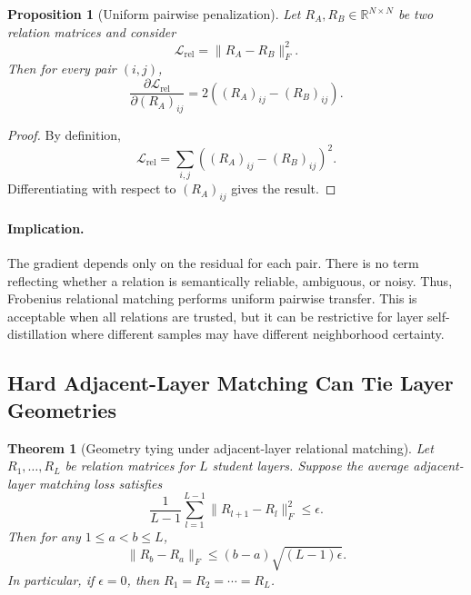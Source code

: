 \documentclass[letterpaper]{article}
\newtheorem{theorem}{Theorem}
\newtheorem{proposition}{Proposition}
\begin{document}
\begin{proposition}[Uniform pairwise penalization]
Let $R_A,R_B\in\mathbb{R}^{N\times N}$ be two relation matrices and consider
\begin{equation}
    \mathcal{L}_{\mathrm{rel}}=\|R_A-R_B\|_F^2.
\end{equation}
Then for every pair $(i,j)$,
\begin{equation}
    \frac{\partial \mathcal{L}_{\mathrm{rel}}}{\partial (R_A)_{ij}}
    =
    2((R_A)_{ij}-(R_B)_{ij}).
\end{equation}
\end{proposition}

\begin{proof}
By definition,
\begin{equation}
    \mathcal{L}_{\mathrm{rel}}
    =
    \sum_{i,j}((R_A)_{ij}-(R_B)_{ij})^2.
\end{equation}
Differentiating with respect to $(R_A)_{ij}$ gives the result.
\end{proof}

\paragraph{Implication.}
The gradient depends only on the residual for each pair. There is no term reflecting whether a relation is semantically reliable, ambiguous, or noisy. Thus, Frobenius relational matching performs uniform pairwise transfer. This is acceptable when all relations are trusted, but it can be restrictive for layer self-distillation where different samples may have different neighborhood certainty.

\subsection{Hard Adjacent-Layer Matching Can Tie Layer Geometries}

\begin{theorem}[Geometry tying under adjacent-layer relational matching]
Let $R_1,\ldots,R_L$ be relation matrices for $L$ student layers. Suppose the average adjacent-layer matching loss satisfies
\begin{equation}
    \frac{1}{L-1}\sum_{l=1}^{L-1}\|R_{l+1}-R_l\|_F^2 \leq \epsilon.
\end{equation}
Then for any $1\leq a<b\leq L$,
\begin{equation}
    \|R_b-R_a\|_F
    \leq
    (b-a)\sqrt{(L-1)\epsilon}.
\end{equation}
In particular, if $\epsilon=0$, then $R_1=R_2=\cdots=R_L$.
\end{theorem}
\end{document}
